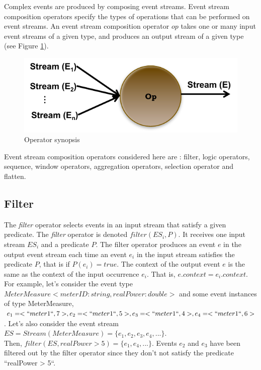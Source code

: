  
 Complex events are produced by composing event streams. Event stream composition operators specify the types of operations that can be performed on event streams. An event stream composition operator $op$ takes one or many input event streams of a given type, and produces an output stream of a given type (see Figure \ref{fig:op}).
 \begin{figure}[H]
  \begin{center}
    \includegraphics[scale=0.65]{chap3/images/op.pdf}
  \end{center}
  \caption{Operator synopsis}
  \label{fig:op}
\end{figure}
Event stream composition operators considered here are : filter, logic operators, sequence, window operators, aggregation operators, selection operator and flatten.  
  \subsection{Filter}
  The \textit{filter} operator selects events in an input stream that satisfy a given predicate. The \textit{filter} operator is denoted $filter (ES_i, P)$. It receives one input stream $ES_i$ and a predicate $P$. The filter operator produces an event $e$ in the output event stream each time an event $e_i$ in the input stream satisfies the predicate $P$, that is if $P(e_i)= true$. The context of the output event $e$ is the same as the context of the input occurrence $e_i$.
  That is, $e.context = e_i.context$.
  \\ For example, let's consider the event type $MeterMeasure<meterID:string, realPower:double>$ and some event instances of type MeterMeasure, $e_1=<``meter1``, 7>, e_2=<``meter1``, 5>, e_3=<``meter1``, 4>, e_4=<``meter1``, 6>$. Let's also consider the event stream $ES=Stream(MeterMeasure)= \{e_1, e_2, e_3, e_4, ... \}$. 
  \\Then, $filter(ES, realPower > 5)= \{e_1, e_4, ... \}$. Events $e_2$ and $e_3$ have been filtered out by the filter operator since they don't not satisfy the predicate ``realPower > 5``.

